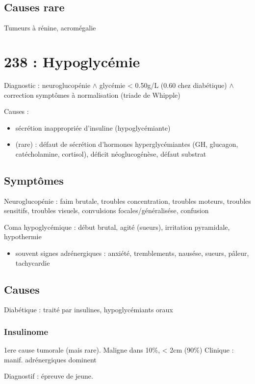 \documentclass[11pt]{article}
\begin{document}
\subsection{Causes rare}
\label{sec:orgc174935}
Tumeurs à rénine, acromégalie
\section{238 : Hypoglycémie}
\label{sec:org110360f}
Diagnostic : neuroglucopénie \(\land\) glycémie < 0.50g/L (0.60 chez diabétique) \(\land\) correction symptômes
à normalisation (triade de Whipple)

Causes :
\begin{itemize}
\item sécrétion inappropriée d'insuline (hypoglycémiante)
\item (rare) : défaut de sécrétion d'hormones hyperglycémiantes (GH, glucagon,
catécholamine, cortisol), déficit néoglucogénèse, défaut substrat
\end{itemize}

\subsection{Symptômes}
\label{sec:org7b0b2a1}
Neuroglucopénie : faim brutale, troubles concentration, troubles moteurs,
troubles sensitifs, troubles visuels, convulsions focales/généralisése,
confusion

Coma hypoglycémique : début brutal, agité (sueurs), irritation pyramidale, hypothermie

\begin{itemize}
\item souvent signes adrénergiques : anxiété, tremblements, nausése, sueurs,
pâleur, tachycardie
\end{itemize}

\subsection{Causes}
\label{sec:org994b584}
Diabétique : traité par insulines, hypoglycémiants oraux

\subsubsection{Insulinome}
\label{sec:org246ea51}
1ere cause tumorale (mais rare). Maligne dans 10\%, < 2cm (90\%)
Clinique : manif. adrénergiques dominent

Diagnostif : épreuve de jeune. 
\end{document}
